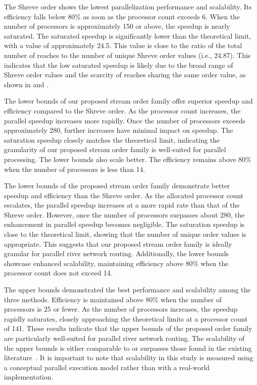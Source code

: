 \documentclass[water,article,submit,pdftex,moreauthors]{Definitions/mdpi}
\begin{document}
The Shreve order shows the lowest parallelization performance and scalability. Its efficiency falls below 80\% as soon as the processor count exceeds 6. When the number of processors is approximately 150 or above, the speedup is nearly saturated. The saturated speedup is significantly lower than the theoretical limit, with a value of approximately 24.5. This value is close to the ratio of the total number of reaches to the number of unique Shreve order values (i.e., 24.87). This indicates that the low saturated speedup is likely due to the broad range of Shreve order values and the scarcity of reaches sharing the same order value, as shown in  and .

The lower bounds of our proposed stream order family offer superior speedup and efficiency compared to the Shreve order. As the processor count increases, the parallel speedup increases more rapidly. Once the number of processors exceeds approximately 280, further increases have minimal impact on speedup. The saturation speedup closely matches the theoretical limit, indicating the granularity of our proposed stream order family is well-suited for parallel processing. The lower bounds also scale better. The efficiency remains above 80\% when the number of processors is less than 14.

The lower bounds of the proposed stream order family demonstrate better speedup and efficiency than the Shreve order. As the allocated processor count escalates, the parallel speedup increases at a more rapid rate than that of the Shreve order. However, once the number of processors surpasses about 280, the enhancement in parallel speedup becomes negligible. The saturation speedup is close to the theoretical limit, showing that the number of unique order values is appropriate. This suggests that our proposed stream order family is ideally granular for parallel river network routing. Additionally, the lower bounds showcase enhanced scalability, maintaining efficiency above 80\% when the processor count does not exceed 14.

The upper bounds demonstrated the best performance and scalability among the three methods. Efficiency is maintained above 80\% when the number of processors is 25 or fewer. As the number of processors increases, the speedup rapidly saturates, closely approaching the theoretical limits at a processor count of 141. These results indicate that the upper bounds of the proposed order family are particularly well-suited for parallel river network routing. The scalability of the upper bounds is either comparable to or surpasses those found in the existing literature~\cite{mizukami2021JAMES, liu2023JH}. It is important to note that scalability in this study is measured using a conceptual parallel execution model rather than with a real-world implementation.
\end{document}
